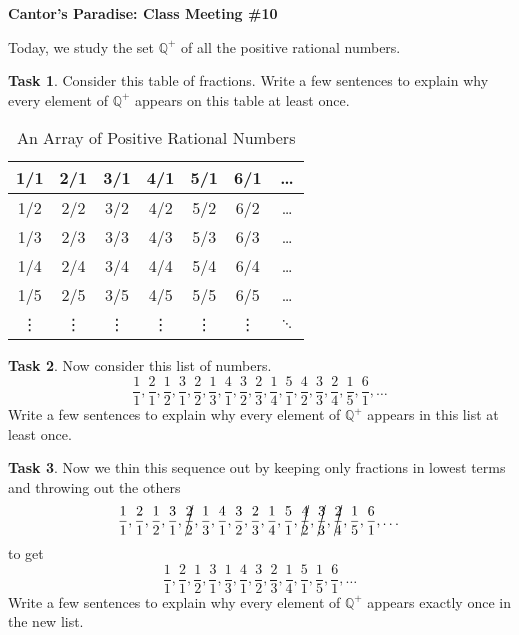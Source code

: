 \documentclass[12pt]{amsart}
\theoremstyle{definition}
\newtheorem{task}{Task}
\begin{document}
\begin{center}
\textbf{\Huge
Cantor's Paradise: Class Meeting \#10
}
\end{center}


\vspace{.5in}

Today, we study the set $\mathbb{Q}^+$ of all the positive rational numbers.

\begin{task}
Consider this table of fractions. Write a few sentences to explain why every element of $\mathbb{Q}^+$ appears on this table at least once.
\begin{table}[htdp]
\begin{center}
\begin{tabular}{|c|c|c|c|c|c|c|}
\hline
1/1 & 2/1 & 3/1 & 4/1& 5/1 & 6/1& \dots \\
\hline
1/2 & 2/2 & 3/2 & 4/2 & 5/2 & 6/2& \dots \\
\hline
1/3 & 2/3 & 3/3 & 4/3 & 5/3 & 6/3& \dots \\
\hline
1/4 & 2/4 & 3/4 & 4/4 & 5/4 & 6/4& \dots \\
\hline
1/5 & 2/5 & 3/5 & 4/5 & 5/5 & 6/5& \dots \\
\hline
\vdots & \vdots & \vdots & \vdots & \vdots & \vdots & $\ddots$ \\
\hline
\end{tabular}
\end{center}
\label{default}
\caption{An Array of Positive Rational Numbers}
\end{table}%
\end{task}

\vspace{2in}

\begin{task} Now consider this list of numbers.
\[
\frac{1}{1}, \frac{2}{1}, \frac{1}{2}, \frac{3}{1}, \frac{2}{2}, \frac{1}{3}, \frac{4}{1}, \frac{3}{2}, \frac{2}{3}, \frac{1}{4}, \frac{5}{1}, \frac{4}{2}, \frac{3}{3}, \frac{2}{4}, \frac{1}{5}, \frac{6}{1}, \dots
\]
Write a few sentences to explain why every element of $\mathbb{Q}^+$ appears in this list at least once.\\
\end{task}

\clearpage

\begin{task}
Now we thin this sequence out by keeping only fractions in lowest terms and throwing out the others
\[
\frac{1}{1}, \frac{2}{1}, \frac{1}{2}, \frac{3}{1}, \cancel{\frac{2}{2}}, \frac{1}{3}, \frac{4}{1}, \frac{3}{2}, \frac{2}{3}, \frac{1}{4}, \frac{5}{1}, \cancel{\frac{4}{2}}, \cancel{\frac{3}{3}}, \cancel{\frac{2}{4}}, \frac{1}{5}, \frac{6}{1}, \dots
\]
to get
\[
\frac{1}{1}, \frac{2}{1}, \frac{1}{2}, \frac{3}{1}, \frac{1}{3}, \frac{4}{1}, \frac{3}{2}, \frac{2}{3}, \frac{1}{4}, \frac{5}{1}, \frac{1}{5}, \frac{6}{1}, \dots
\]
Write a few sentences to explain why every element of $\mathbb{Q}^+$ appears exactly once in the new list.\\
\end{task}
\end{document}
